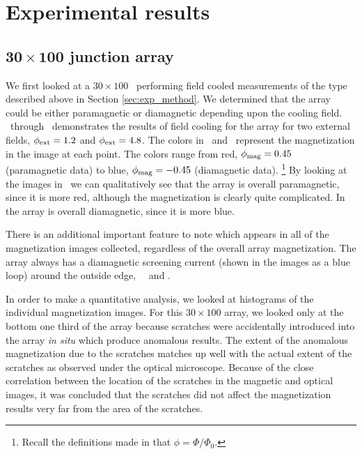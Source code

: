 \section{Experimental results}

\subsection[$30 \times 100$ junction array]
{$\mathbf{30 \times 100}$ junction array}

We first looked at a $30 \times 100$ \jja\ performing field cooled 
measurements of the type
described above in 
Section \ref{sec:exp_method}. We determined that the array could be 
either paramagnetic or diamagnetic depending upon the cooling field. 
\ through
\ demonstrates the results of field cooling 
for the array for two external fields, $\phi_{\mathrm{ext}} = 1.2$ and $\phi_{\mathrm{ext}} = 4.8$. 
The colors in \ and
\ represent the magnetization
in the image at each point. 
The colors range from 
red, $\phi_{\mathrm{mag}} = 0.45$ (paramagnetic data)
to blue, $\phi_{\mathrm{mag}} = -0.45$ (diamagnetic data).%
\footnote{Recall the definitions made in 
that $\phi = \Phi/\Phi_0$.}
By looking at the images in \
we can qualitatively see that the
array is overall paramagnetic, since it is more red,
although the magnetization
is clearly quite complicated. In 
the array is overall diamagnetic, since it is more blue. 

There is an additional important feature to note which appears in all of the
magnetization images collected, regardless of the overall array magnetization.
The array always has a diamagnetic screening current (shown in the images
as a blue loop) around the outside
edge, \cf\ \  and . 

In order to make a quantitative analysis,
we looked at histograms of the individual magnetization images.
For this $30 \times 100$ array, we looked only at the bottom one third
of the array because scratches were accidentally introduced into the 
array \textit{in situ} which produce anomalous results. 
The extent of the
anomalous magnetization due to the scratches matches up well with the 
actual extent of the scratches as observed under the optical microscope.
Because of the close correlation between the location of the scratches
in the magnetic and optical images, it was concluded that the scratches
did not affect the magnetization results very far from the area of the
scratches. 

